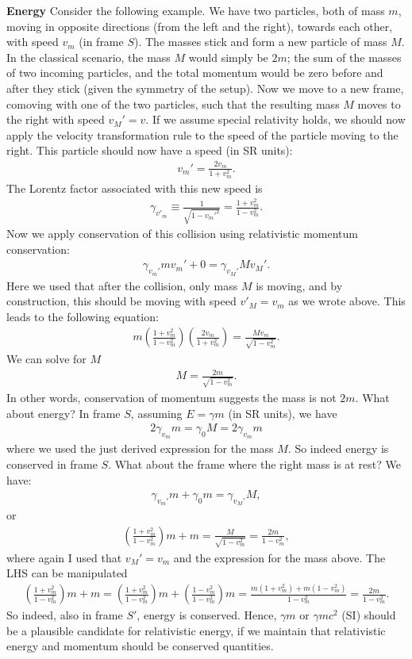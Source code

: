 \documentclass[12pt]{article}
\newcommand{\be}{\begin{eqnarray}}
\newcommand{\ee}{\end{eqnarray}}
\begin{document}
\noindent 
{\bf Energy} Consider the following example. We have two particles, both of mass $m$, moving in opposite directions (from the left and the right), towards each other, with speed $v_m$ (in frame $S$). The masses stick and form a new particle of mass $M$. In the classical scenario, the mass $M$ would simply be $2m$; the sum of the masses of two incoming particles, and the total momentum would be zero before and after they stick (given the symmetry of the setup). Now we move to a new frame, comoving with one of the two particles, such that the resulting mass $M$ moves to the right with speed $v_M' = v$. If we assume special relativity holds, we should now apply the velocity transformation rule to the speed of the particle moving to the right. This particle should now have a speed (in SR units):
\be
v_m'= \frac{2v_m}{1+v_m^2}. 
\ee
The Lorentz factor associated with this new speed is 
\be
\gamma_{v'_m} \equiv \frac{1}{\sqrt{1-v_m'^2}} = \frac{1+v_m^2}{1-v_m^2}.
\ee
Now we apply conservation of this collision using relativistic momentum conservation:
\be
\gamma_{v_m'} m v_m' + 0 = \gamma_{v_M'} M v_M'.
\ee
Here we used that after the collision, only mass $M$ is moving, and by construction, this should be moving with speed $v'_M = v_m$ as we wrote above. This leads to the following equation:
\be
m\left( \frac{1+v_m^2}{1-v_m^2}\right)\left(\frac{2v_m}{1+v_m^2}\right) = \frac{M v_m}{\sqrt{1-v_m^2}}.
\ee
We can solve for $M$
\be
M = \frac{2m}{\sqrt{1-v_m^2}}.
\ee
In other words, conservation of momentum suggests the mass is not $2m$. What about energy? In frame $S$, assuming $E = \gamma m$ (in SR units), we have 
\be
2 \gamma_{v_m} m  = \gamma_0 M = 2 \gamma_{v_m} m
\ee
where we used the just derived expression for the mass $M$. So indeed energy is conserved in frame $S$. What about the frame where the right mass is at rest? We have:
\be
\gamma_{v_m'} m  + \gamma_0 m = \gamma_{v_M'} M,
\ee
or 
\be
\left(\frac{1+v_m^2}{1-v_m^2}\right)m + m = \frac{M}{\sqrt{1-v_m^2}} = \frac{2m}{1-v_m^2}, 
\ee
where again I used that $v_M' = v_m$ and the expression for the mass above.  The LHS can be manipulated    
\be
\left(\frac{1+v_m^2}{1-v_m^2}\right)m + m = \left(\frac{1+v_m^2}{1-v_m^2}\right)m + \left(\frac{1-v_m^2}{1-v_m^2}\right)m  = \frac{m(1+v_m^2) + m (1-v_m^2)}{1-v_m^2} = \frac{2m}{1-v_m^2}.\nonumber
\ee
So indeed, also in frame $S'$, energy is conserved. Hence, $\gamma m$ or $\gamma m c^2$ (SI) should be a plausible candidate for relativistic energy, if we maintain that relativistic energy and momentum should be conserved quantities. 
\end{document}
